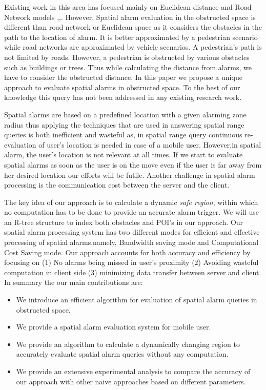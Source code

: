\documentclass{sig-alternate}
\begin{document}
Existing work in this area has focused mainly on Euclidean distance and Road Network models \cite{bamba},\cite{roadalarm},\cite{liu}. However, Spatial alarm evaluation in the obstructed space is different than road network or Euclidean space as it considers the obstacles in the path to the location of alarm. It is better approximated by a pedestrian scenario while road networks are approximated by vehicle scenarios. A pedestrian's path is not limited by roads. However, a pedestrian is obstructed by various obstacles such as buildings or trees. Thus while calculating the distance from alarms, we have to consider the obstructed distance\cite{deberg}. In this paper we propose a unique approach to evaluate spatial alarms in obstructed space. To the best of our knowledge this query has not been addressed in any existing research work.

Spatial alarms are based on a predefined location with a given alarming zone radius thus applying the techniques that are used in answering spatial range queries is both inefficient and wasteful as, in spatial range query continuous re-evaluation of user's location is needed in case of a mobile user. However,in spatial alarm, the user's location is not relevant at all times. If we start to evaluate spatial alarms as soon as the user is on the move even if the user is far away from her desired location our efforts will be futile. Another  challenge in spatial alarm processing is the communication cost between the server and the client.

The key idea of our approach is to calculate a dynamic \textit{safe region}, within which no computation has to be done to provide an accurate alarm trigger. We will use an R-tree structure to index both obstacles and POI's in our approach. Our spatial alarm processing system has two different modes for efficient and effective processing of spatial alarms,namely, Bandwidth saving mode and Computational Cost Saving mode. Our approach accounts for both accuracy and efficiency by focusing on (1) No alarms being missed in user's proximity (2) Avoiding wasteful computation in client side (3) minimizing data transfer between server and client. In summary the our main contributions are: 
\begin{itemize}
\setlength\itemsep{0em}
\item We introduce an efficient algorithm for evaluation of spatial alarm queries in obstructed space.
\item We provide a spatial alarm evaluation system for mobile user.
\item We provide an algorithm to calculate a dynamically changing region to accurately evaluate spatial alarm queries without any computation.
\item We provide an extensive experimental analysis to compare the accuracy of our approach with other naive approaches based on different parameters.
\end{itemize}
\end{document}

